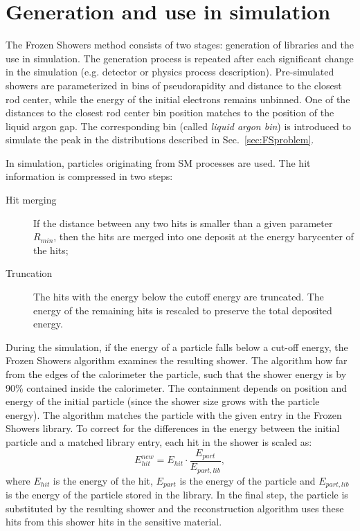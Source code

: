 \section{Generation and use in simulation}\label{sec:FSProdUse}

The Frozen Showers method consists of two stages: generation of libraries and the use in simulation. The generation process is repeated after each significant change in the simulation (e.g. detector or physics process description). Pre-simulated showers are parameterized in bins of pseudorapidity and distance to the closest rod center, while the energy of the initial electrons remains unbinned. One of the distances to the closest rod center bin position matches to the position of the liquid argon gap. The corresponding bin  (called \textit{liquid argon bin}) is introduced to simulate the peak in the distributions described in Sec.~\ref{sec:FSproblem}. 

In simulation, particles originating from SM processes are used. The hit information is compressed in two steps: 
\begin{description}
\item [Hit merging] If the distance between any two hits is smaller than a given parameter $R_{min}$, then the hits are merged into one deposit at the energy barycenter of the hits;
\item [Truncation] The hits with the energy below the cutoff energy are truncated. The energy of the remaining hits is rescaled to preserve the total deposited energy.
\end{description}

During the simulation, if the energy of a particle falls below a cut-off energy, the Frozen Showers algorithm examines the resulting shower. The algorithm how far  from the edges of the calorimeter the particle, such that the shower energy is by 90\% contained inside the calorimeter. The containment depends on position and energy of the initial particle (since the  shower size grows with  the particle energy). The algorithm matches the particle with the given entry in the Frozen Showers library. To correct for the differences in the energy between the initial particle and a matched library entry, each hit in the shower is scaled as:
\begin{equation}
E_{hit}^{new}=E_{hit}\cdot \frac{E_{part}}{E_{part,lib}},
\end{equation}
where $E_{hit}$ is the energy of the hit, $E_{part}$ is the energy of the particle and $E_{part,lib}$ is the energy of the particle stored in the library. In the final step, the particle is substituted by the resulting shower and the reconstruction algorithm uses these hits from this shower hits in the sensitive material.



